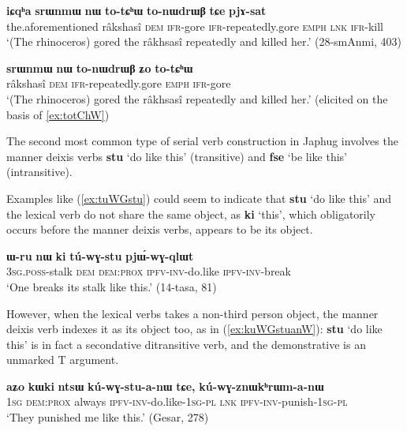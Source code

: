 \documentclass[oneside,a4paper,11pt]{article}
\newcommand{\ipa}[1]{\textbf{\phon#1}} %
\newcommand{\jpg}[2]{\ipa{#1} `#2'} %
\begin{document}
\begin{exe}
\ex \label{ex:totChW}
\gll \ipa{iɕqʰa} 	\ipa{srɯnmɯ} 	\ipa{nɯ} 	\ipa{to-tɕʰɯ} 	\ipa{to-nɯdrɯβ}  \ipa{tɕe} 	\ipa{pjɤ-sat} \\
the.aforementioned râkshasî \textsc{dem} \textsc{ifr}-gore \textsc{ifr}-repeatedly.gore \textsc{emph} \textsc{lnk} \textsc{ifr}-kill \\
\glt `(The rhinoceros) gored the râkhsasî repeatedly and killed her.' (28-smAnmi, 403)
\end{exe}

\begin{exe}
\ex \label{ex:totChW2}
\gll 	\ipa{srɯnmɯ} 	\ipa{nɯ} 	\ipa{to-nɯdrɯβ} 	\ipa{ʑo} 	 	\ipa{to-tɕʰɯ} \\
 râkshasî \textsc{dem}  \textsc{ifr}-repeatedly.gore  \textsc{emph}  \textsc{ifr}-gore \\
 \glt `(The rhinoceros) gored the râkhsasî repeatedly and killed her.' (elicited on the basis of \ref{ex:totChW})
\end{exe}	

The second most common type of serial verb construction in Japhug involves the manner deixis verbs \jpg{stu}{do like this} (transitive) and \jpg{fse}{be like this} (intransitive). 

Examples like (\ref{ex:tuWGstu}) could seem to indicate that \jpg{stu}{do like this} and the lexical verb do not share the same object, as  \jpg{ki}{this}, which obligatorily occurs before the manner deixis verbs, appears to be its object. 

\begin{exe}
\ex \label{ex:tuWGstu}
\gll 	
\ipa{ɯ-ru} 	\ipa{nɯ} 	\ipa{ki} 	\ipa{tú-wɣ-stu} 	\ipa{pjɯ́-wɣ-qlɯt} \\
\textsc{3sg.poss}-stalk \textsc{dem} \textsc{dem:prox} \textsc{ipfv-inv}-do.like \textsc{ipfv-inv}-break \\
\glt `One breaks its stalk like this.' (14-tasa, 81)
\end{exe}	

However, when the lexical verbs takes a non-third person object, the manner deixis verb indexes it as its object too, as in (\ref{ex:kuWGstuanW}): \jpg{stu}{do like this} is in fact a secondative ditransitive verb, and the demonstrative is an unmarked T argument.

\begin{exe}
\ex \label{ex:kuWGstuanW}
\gll 	
 \ipa{aʑo} 	\ipa{kɯki} 	\ipa{ntsɯ} 	\ipa{kú-wɣ-stu-a-nɯ} 	\ipa{tɕe,} 	\ipa{kú-wɣ-znɯkʰrɯm-a-nɯ} \\
 \textsc{1sg} \textsc{dem:prox} always \textsc{ipfv-inv}-do.like-\textsc{1sg-pl} \textsc{lnk} \textsc{ipfv-inv}-punish-\textsc{1sg-pl} \\
 \glt `They punished me like this.' (Gesar, 278)
\end{exe}	
\end{document}
